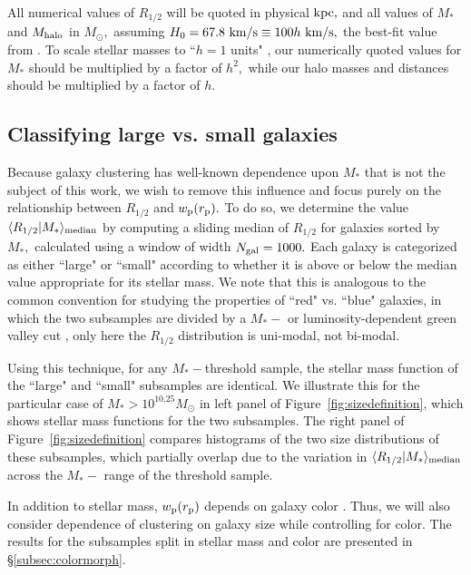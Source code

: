 \documentclass[usenatbib,usegraphicx,letterpaper]{mn2e}
\newcommand{\rhalf}{R_{1/2}}
\newcommand{\mstar}{M_{\ast}}
\newcommand{\mhalo}{M_{\rm halo}}
\newcommand{\rproj}{r_{\rm p}}
\newcommand{\wproj}{w_{\rm p}}
\newcommand{\median}[2]{\langle{#1}\vert{#2}\rangle_{\rm median}}
\newcommand{\kpc}{{\rm kpc}}
\newcommand{\msun}{M_\odot}
\newcommand{\kms}{{\rm km/s}}
\begin{document}
All numerical values of $\rhalf$ will be quoted in physical $\kpc,$ and all values of $\mstar$ and $\mhalo$ in $\msun,$ assuming $H_0=67.8~\kms\equiv100h~\kms,$ the best-fit value from \citet{planck15}. To scale stellar masses to ``$h=1$ units" \citep{croton13}, our numerically quoted values for $\mstar$ should be multiplied by a factor of $h^2,$ while our halo masses and distances should be multiplied by a factor of $h.$

\subsection{Classifying large vs. small galaxies}
\label{subsec:sizedef}

Because galaxy clustering has well-known dependence upon $\mstar$ that is not the subject of this work, we wish to remove this influence and focus purely on the relationship between $\rhalf$ and $\wproj(\rproj).$ To do so, we determine the value $\median{\rhalf}{\mstar}$ by computing a sliding median of $\rhalf$ for galaxies sorted by $\mstar,$ calculated using a window of width $N_{\rm gal}=1000.$ Each galaxy is categorized as either ``large" or ``small" according to whether it is above or below the median value appropriate for its stellar mass. We note that this is analogous to the common convention for studying the properties of ``red" vs. ``blue" galaxies, in which the two subsamples are divided by a $\mstar-$ or luminosity-dependent green valley cut \citep[e.g.,][]{vdB_etal08,zehavi_etal11}, only here the $\rhalf$ distribution is uni-modal, not bi-modal.

Using this technique, for any $\mstar-$threshold sample, the stellar mass function of the ``large" and ``small" subsamples are identical. We illustrate this for the particular case of $\mstar>10^{10.25}\msun$ in left panel of Figure~\ref{fig:sizedefinition}, which shows stellar mass functions for the two subsamples. The right panel of Figure~\ref{fig:sizedefinition} compares histograms of the two size distributions of these subsamples, which partially overlap due to the variation in $\median{\rhalf}{\mstar}$ across the $\mstar-$ range of the threshold sample.

In addition to stellar mass, $\wproj(\rproj)$ depends on galaxy color \citep[e.g.,][]{zehavi_etal11}. Thus, we will also consider
dependence of clustering on galaxy size while controlling for color. The results for the subsamples split in stellar mass and color are presented in \S\ref{subsec:colormorph}.
\end{document}
